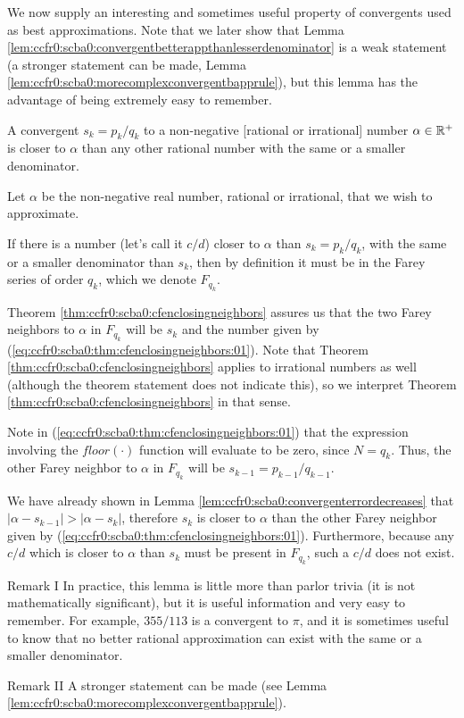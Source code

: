 We now supply an interesting and sometimes useful property of
convergents used as best approximations.  Note that we later show that
Lemma \ref{lem:ccfr0:scba0:convergentbetterappthanlesserdenominator}
is a weak statement (a stronger statement can be made, Lemma
\ref{lem:ccfr0:scba0:morecomplexconvergentbapprule}), but this lemma
has the advantage of being extremely easy to remember.

\begin{vworklemmastatement}
\label{lem:ccfr0:scba0:convergentbetterappthanlesserdenominator}
A convergent $s_k = p_k/q_k$ to a non-negative [rational or irrational] number
$\alpha \in {\mathbb{R}^+}$ is closer to $\alpha$
than any other rational number with the same or a smaller
denominator.
\end{vworklemmastatement}
\begin{vworklemmaproof}
Let $\alpha$ be the non-negative real number, rational or irrational,
that we wish to approximate.

If there is a number (let's call it $c/d$)
closer to $\alpha$ than $s_k = p_k / q_k$, with the same or a smaller denominator
than $s_k$, then by definition it must be in the Farey series of order
$q_k$, which we denote $F_{q_k}$.

Theorem \ref{thm:ccfr0:scba0:cfenclosingneighbors}
assures us that the two Farey neighbors to $\alpha$ in $F_{q_k}$ will be
$s_k$ and the number given by (\ref{eq:ccfr0:scba0:thm:cfenclosingneighbors:01}).
Note that Theorem \ref{thm:ccfr0:scba0:cfenclosingneighbors}
applies to irrational numbers as well (although the theorem statement
does not indicate this), so we interpret 
Theorem \ref{thm:ccfr0:scba0:cfenclosingneighbors}
in that sense.

Note in (\ref{eq:ccfr0:scba0:thm:cfenclosingneighbors:01}) that the 
expression involving the $floor(\cdot{})$ function will evaluate 
to be zero, since $N=q_k$.  Thus, the other Farey neighbor to 
$\alpha$ in $F_{q_k}$ will be $s_{k-1} = p_{k-1}/q_{k-1}$.

We have already shown in Lemma \ref{lem:ccfr0:scba0:convergenterrordecreases} 
that $|\alpha - s_{k-1}| > |\alpha - s_{k}|$, therefore
$s_k$ is closer to $\alpha$ than the other Farey neighbor given
by (\ref{eq:ccfr0:scba0:thm:cfenclosingneighbors:01}).
Furthermore, because any $c/d$ which is closer to $\alpha$ than
$s_k$ must be present in $F_{q_k}$, such a $c/d$ does not exist.
\end{vworklemmaproof}
\begin{vworklemmaparsection}{Remark I}
In practice, this lemma is little more than parlor trivia
(it is not mathematically significant), but it is useful
information and very easy to remember.  For example, $355/113$ is a convergent to
$\pi$, and it is sometimes useful to know that no better rational approximation
can exist with the same or a smaller denominator.
\end{vworklemmaparsection}
\begin{vworklemmaparsection}{Remark II}
A stronger statement can be made (see
Lemma \ref{lem:ccfr0:scba0:morecomplexconvergentbapprule}).
\end{vworklemmaparsection}
\vworklemmafooter{}

